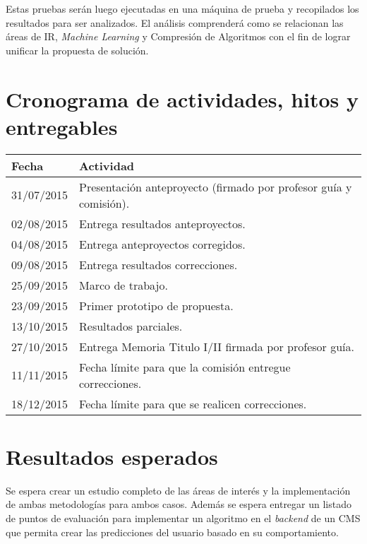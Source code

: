 \documentclass{udparticle}
\begin{document}
Estas pruebas serán luego ejecutadas en una máquina de prueba y recopilados los resultados para ser analizados.
El análisis comprenderá como se relacionan las áreas de IR, \emph{Machine Learning} y Compresión de Algoritmos con el fin de lograr unificar la propuesta de solución. 

\section{Cronograma de actividades, hitos y entregables}
  \begin{center}
  \begin{tabular}{ll}
  \hline\noalign{\smallskip}
  Fecha & Actividad \\
  \hline\noalign{\smallskip}
  31/07/2015 & Presentación anteproyecto (firmado por profesor guía y comisión).\\
  02/08/2015 & Entrega resultados anteproyectos.\\
  04/08/2015 & Entrega anteproyectos corregidos.\\
  09/08/2015 & Entrega resultados correcciones.\\
  25/09/2015 & Marco de trabajo.\\
  23/09/2015 & Primer prototipo de propuesta.\\
  13/10/2015 & Resultados parciales.\\
  27/10/2015 & Entrega Memoria Titulo I/II firmada por profesor guía.\\
  11/11/2015 & Fecha límite para que la comisión entregue correcciones.\\
  18/12/2015 & Fecha límite para que se realicen correcciones.\\
  \hline
  \end{tabular}
  \end{center}


\section{Resultados esperados}

Se espera crear un estudio completo de las áreas de interés y la implementación de ambas metodologías para ambos casos.
Además se espera entregar un listado de puntos de evaluación para implementar un algoritmo en el \emph{backend} de un CMS que permita crear las predicciones
del usuario basado en su comportamiento.

  
% 


 
\end{document}
